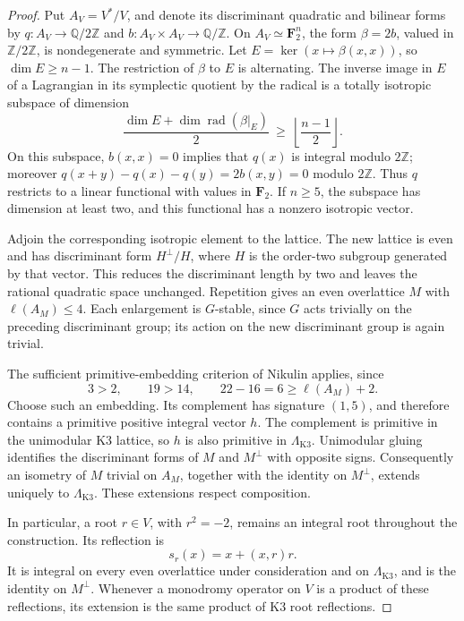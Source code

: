 \documentclass[11pt]{amsart}
\newcommand{\Q}{\mathbb Q}
\newcommand{\Z}{\mathbb Z}
\theoremstyle{definition}
\theoremstyle{remark}
\numberwithin{equation}{section}
\begin{document}
\begin{proof}
Put \(A_V=V^*/V\), and denote its discriminant quadratic and bilinear forms by
\(q:A_V\to\Q/2\Z\) and \(b:A_V\times A_V\to\Q/\Z\).
On \(A_V\simeq\mathbf F_2^n\), the form \(\beta=2b\), valued in
\(\Z/2\Z\), is nondegenerate and symmetric.  Let
\(E=\ker(x\mapsto\beta(x,x))\), so \(\dim E\geq n-1\).
The restriction of \(\beta\) to \(E\) is alternating.  The inverse
image in \(E\) of a Lagrangian in its symplectic quotient by the radical
is a totally isotropic subspace of dimension
\[
 \frac{\dim E+\dim\operatorname{rad}(\beta|_E)}2
 \ \geq\ \left\lfloor\frac{n-1}{2}\right\rfloor.
\]
On this subspace, \(b(x,x)=0\) implies that \(q(x)\) is integral
modulo \(2\Z\); moreover
\(q(x+y)-q(x)-q(y)=2b(x,y)=0\) modulo \(2\Z\).
Thus \(q\) restricts to a linear functional with values in
\(\mathbf F_2\).  If \(n\geq5\), the subspace has dimension at least
two, and this functional has a nonzero isotropic vector.

Adjoin the corresponding isotropic element to the lattice.  The new
lattice is even and has discriminant form \(H^\perp/H\), where \(H\)
is the order-two subgroup generated by that vector.  This reduces the
discriminant length by two and leaves the rational quadratic space
unchanged.  Repetition gives an even overlattice
\(M\) with \(\ell(A_M)\leq4\).  Each enlargement is \(G\)-stable, since
\(G\) acts trivially on the preceding discriminant group; its action on
the new discriminant group is again trivial.

The sufficient primitive-embedding criterion of Nikulin
\cite[Chapter~14, Theorem~1.12]{Huybrechts} applies, since
\[
  3>2,\qquad 19>14,\qquad
  22-16=6\geq\ell(A_M)+2.
\]
Choose such an embedding.  Its complement has signature \((1,5)\), and
therefore contains a primitive positive integral vector \(h\).  The
complement is primitive in the unimodular K3 lattice, so \(h\) is also
primitive in \(\Lambda_{\mathrm{K3}}\).
Unimodular gluing identifies the discriminant forms of \(M\) and
\(M^\perp\) with opposite signs.  Consequently an isometry of \(M\)
trivial on \(A_M\), together with the identity on \(M^\perp\), extends
uniquely to \(\Lambda_{\mathrm{K3}}\).  These extensions respect composition.

In particular, a root \(r\in V\), with \(r^2=-2\), remains an integral
root throughout the construction.  Its reflection is
\[
 s_r(x)=x+(x,r)r.
\]
It is integral on every even overlattice under consideration and on
\(\Lambda_{\mathrm{K3}}\), and is the identity on \(M^\perp\).
Whenever a monodromy operator on \(V\) is a product of these
reflections, its extension is the same product of K3 root reflections.
\end{proof}
\end{document}
